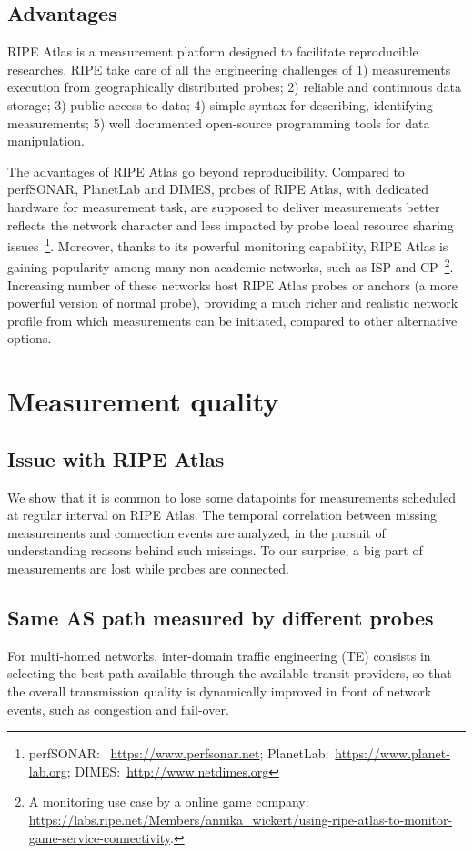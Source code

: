 \subsection{Advantages}
RIPE Atlas is a measurement platform designed to facilitate reproducible researches. RIPE take care of all the engineering challenges of 1) measurements execution from geographically distributed probes; 2) reliable and continuous data storage; 3) public access to data; 4) simple syntax for describing, identifying measurements; 5) well documented open-source programming tools for data manipulation.

The advantages of RIPE Atlas go beyond reproducibility. Compared to perfSONAR, PlanetLab and DIMES, probes of RIPE Atlas, with dedicated hardware for measurement task, are supposed to deliver measurements better reflects the network character and less impacted by probe local resource sharing issues~\footnote{perfSONAR: ~\url{https://www.perfsonar.net}; PlanetLab:~\url{https://www.planet-lab.org}; DIMES:~\url{http://www.netdimes.org}}.
Moreover, thanks to its powerful monitoring capability, RIPE Atlas is gaining popularity among many non-academic networks, such as \ac{ISP} and \ac{CP}~\footnote{A monitoring use case by a online game company: \url{https://labs.ripe.net/Members/annika_wickert/using-ripe-atlas-to-monitor-game-service-connectivity}.}. Increasing number of these networks host RIPE Atlas probes or anchors (a more powerful version of normal probe),   providing a much richer and realistic network profile from which measurements can be initiated, compared to other alternative options.

\section{Measurement quality}
\subsection{Issue with RIPE Atlas}
We show that it is common to lose some datapoints for measurements scheduled at regular interval on RIPE Atlas. 
The temporal correlation between missing measurements and connection events are %
analyzed, in the pursuit of understanding reasons behind such missings.
To our surprise, a big part of measurements are lost while probes are connected.

\subsection{Same AS path measured by different probes}
For multi-homed networks, inter-domain traffic engineering (TE) 
consists in selecting the best path available through the available transit providers,
so that the overall transmission quality is dynamically improved in front of network events, such as congestion and fail-over. 

